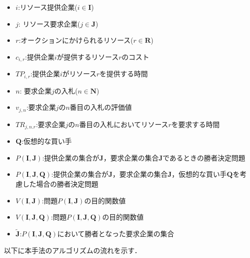 \begin{itemize}
\tightlist
\item
  \(i\):リソース提供企業(\(i \in \boldsymbol{I}\))
\item
  \(j\): リソース要求企業(\(j \in \boldsymbol{J}\))
\item
  \(r\):オークションにかけられるリソース(\(r \in \boldsymbol{R}\))
\item
  \(c_{i,r}\):提供企業\(i\)が提供するリソース\(r\)のコスト
\item
  \(TP_{i,r}\):提供企業\(i\)がリソース\(r\)を提供する時間
\item
  \(n\): 要求企業\(j\)の入札(\(n \in \boldsymbol{N}\))
\item
  \(v_{j,n}\):要求企業\(j\)の\(n\)番目の入札の評価値
\item
  \(TR_{j,n.r}\):要求企業\(j\)の\(n\)番目の入札においてリソース\(r\)を要求する時間
\item
  \(\boldsymbol{Q}\):仮想的な買い手
\item
  \(P(\boldsymbol{I},\boldsymbol{J})\):提供企業の集合が\(\boldsymbol{J}\)，要求企業の集合\(\boldsymbol{J}\)であるときの勝者決定問題
\item
  \(P(\boldsymbol{I},\boldsymbol{J},\boldsymbol{Q})\):提供企業の集合が\(\boldsymbol{J}\)，要求企業の集合\(\boldsymbol{J}\)，仮想的な買い手\(\boldsymbol{Q}\)を考慮した場合の勝者決定問題
\item
  \(V(\boldsymbol{I},\boldsymbol{J})\):問題\(P(\boldsymbol{I},\boldsymbol{J})\)の目的関数値
\item
  \(V(\boldsymbol{I},\boldsymbol{J},\boldsymbol{Q})\):問題\(P(\boldsymbol{I},\boldsymbol{J},\boldsymbol{Q})\)の目的関数値
\item
  \(\boldsymbol{\tilde{J}}\):\(P(\boldsymbol{I},\boldsymbol{J},\boldsymbol{Q})\)において勝者となった要求企業の集合
\end{itemize}

以下に本手法のアルゴリズムの流れを示す．

